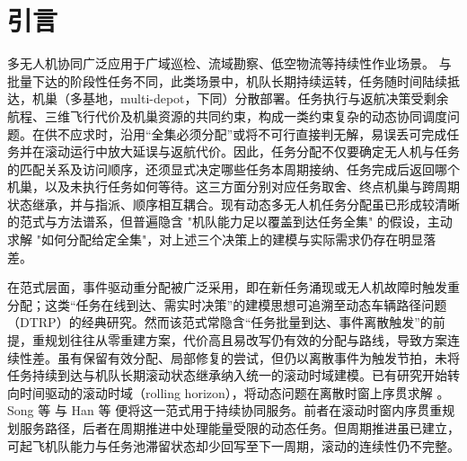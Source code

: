 
\section{引言}



多无人机协同广泛应用于广域巡检、流域勘察、低空物流等持续性作业场景\cite{chung2018aerialswarm, shakhatreh2019uavapps}。
与批量下达的阶段性任务不同，此类场景中，机队长期持续运转，任务随时间陆续抵达，机巢（多基地，multi-depot，下同）分散部署。任务执行与返航决策受剩余航程、三维飞行代价及机巢资源的共同约束，构成一类约束复杂的动态协同调度问题。在供不应求时，沿用“全集必须分配”或将不可行直接判无解，易误丢可完成任务并在滚动运行中放大延误与返航代价。因此，任务分配不仅要确定无人机与任务的匹配关系及访问顺序，还须显式决定哪些任务本周期接纳、任务完成后返回哪个机巢，以及未执行任务如何等待。这三方面分别对应任务取舍、终点机巢与跨周期状态继承，并与指派、顺序相互耦合。现有动态多无人机任务分配虽已形成较清晰的范式与方法谱系，但普遍隐含 "机队能力足以覆盖到达任务全集" 的假设，主动求解 "如何分配给定全集"，对上述三个决策上的建模与实际需求仍存在明显落差。



在范式层面，事件驱动重分配被广泛采用\cite{alqefari_multi-uav_2025, wang2024review}，即在新任务涌现或无人机故障时触发重分配；这类“任务在线到达、需实时决策”的建模思想可追溯至动态车辆路径问题（DTRP）的经典研究\cite{bertsimas1991dtrp}。然而该范式常隐含“任务批量到达、事件离散触发”的前提，重规划往往从零重建方案，代价高且易改写仍有效的分配与路线，导致方案连续性差。虽有保留有效分配、局部修复的尝试\cite{hwang2026apr, shen2026lrpsodta}，但仍以离散事件为触发节拍，未将任务持续到达与机队长期滚动状态继承纳入统一的滚动时域建模。已有研究开始转向时间驱动的滚动时域（rolling horizon），将动态问题在离散时窗上序贯求解 \cite {wang2015rh}。Song 等 \cite {song2016rollinghorizon} 与 Han 等 \cite {han2025apso} 便将这一范式用于持续协同服务。前者在滚动时窗内序贯重规划服务路径，后者在周期推进中处理能量受限的动态任务。但周期推进虽已建立，可起飞机队能力与任务池滞留状态却少回写至下一周期，滚动的连续性仍不完整。

